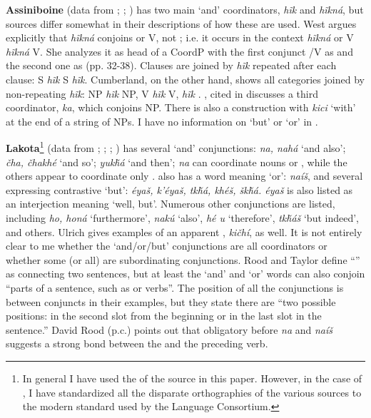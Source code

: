 \documentclass[output=paper]{LSP/langsci}
\begin{document}
\textbf{Assiniboine} (data from \citealt{West2003}; \citealt{Cumberland2005}; \citealt{Levin1964}) has two main `and' coordinators, \textit{h\~ik} and \textit{h\~ikná}, but sources differ somewhat in their descriptions of how these are used. West argues explicitly that \textit{h\~ikná} conjoins  or V, not ; i.e. it occurs in the context  \textit{h\~ikná}  or V \textit{h\~ikná} V. She analyzes it as head of a CoordP with the first conjunct /V as  and the second one as  (pp. 32-38). Clauses are joined by \textit{h\~ik} repeated after each clause: S \textit{h\~ik} S \textit{h\~ik}. Cumberland, on the other hand, shows all categories joined by non-repeating \textit{h\~ik}: NP \textit{h\~ik} NP, V \textit{h\~ik} V,  \textit{h\~ik} . \citet{Levin1964}, cited in \citet[36]{Stassen2000} discusses a third coordinator, \textit{ka}, which conjoins NP. There is also a  construction with \textit{kici} `with' at the end of a string of NPs. I have no information on `but' or `or' in .

\textbf{Lakota}\footnote{In general I have used the  of the source in this paper. However, in the case of , I have standardized all the disparate orthographies of the various sources to the modern standard  used by the  Language Consortium.} (data from  \citealt{RoodTaylor1996}; \citealt{Ingham2003}; \citealt{Ullrich2016};  \citealt{BoasDeloria1941}) has several `and' conjunctions: \textit{na, nahá} `and also'; \textit{\v{c}ha, \v{c}hakhé} `and so'; \textit{yuk\v{h}á} `and then'; \textit{na} can coordinate nouns or , while the others appear to coordinate only .  also has a word meaning `or': \textit{naí\v{s}}, and several expressing contrastive  `but': \textit{éya\v{s}, k'éya\v{s}, tk\v{h}á, khé\v{s}, \v{s}k\v{h}á. éya\v{s}} is also listed as an interjection meaning `well, but'. Numerous other conjunctions are listed, including \textit{ho, honá} `furthermore', \textit{nakú} `also', \textit{hé u} `therefore', \textit{tk\v{h}á\v{s}} `but indeed', and others. Ulrich gives examples of an apparent , \textit{ki\v{c}hí}, as well. It is not entirely clear to me whether the `and/or/but' conjunctions are all coordinators or whether some (or all) are subordinating conjunctions. Rood and Taylor define ``'' as connecting two sentences, but at least the `and' and `or' words can also conjoin ``parts of a sentence, such as  or verbs''. The position of all the conjunctions is between conjuncts in their examples, but they state there are ``two possible positions: in the second slot from the beginning or in the last slot in the sentence.'' David Rood (p.c.) points out that obligatory  before \textit{na} and \textit{naí\v{s}} suggests a strong bond between the  and the preceding verb.
\end{document}
